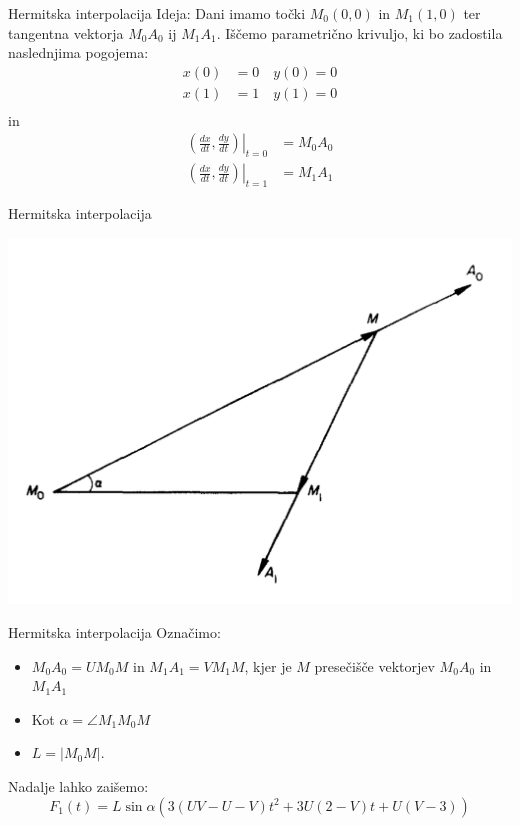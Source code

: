 \documentclass{beamer} %
\begin{document}
\begin{frame}{Hermitska interpolacija}
	Ideja: Dani imamo točki $M_0 (0,0)$ in $M_1 (1,0)$ ter tangentna vektorja $M_0A_0$ ij $M_1A_1$. Iščemo parametrično krivuljo, ki bo zadostila naslednjima pogojema:
	\begin{align*}
		x(0) &= 0 \quad y(0) = 0 \\
		x(1) &= 1 \quad y(1) = 0 \\
	\end{align*}
in
	\begin{align*}
		 \left. \left(\frac{dx}{dt},\frac{dy}{dt}\right)\right|_{t=0} &= M_0A_0 \\
		\left.\left(\frac{dx}{dt},\frac{dy}{dt}\right)\right|_{t=1} &= M_1A_1
	\end{align*}
	 
\end{frame}

\begin{frame}{Hermitska interpolacija}
	\begin{center}
	\includegraphics[width=0.6\columnwidth]{hermit.jpg}
	\end{center}
\end{frame}

\begin{frame}{Hermitska interpolacija}
	Označimo:
	\begin{itemize}
		\item $ M_0A_0=UM_0M$ in  $M_1A_1 = VM_1M$,
		kjer je $M$ presečišče vektorjev $M_0A_0$ in $M_1A_1$
		\item Kot $\alpha =  \angle M_1M_0M$
		\item $L = |M_0M|$.
	\end{itemize}
	Nadalje lahko zaišemo:
	\[ F_1(t) =L\sin\alpha(3(UV-U-V)t^2 +3U(2-V)t+ U(V-3)) \]
	
\end{frame}
\end{document}
